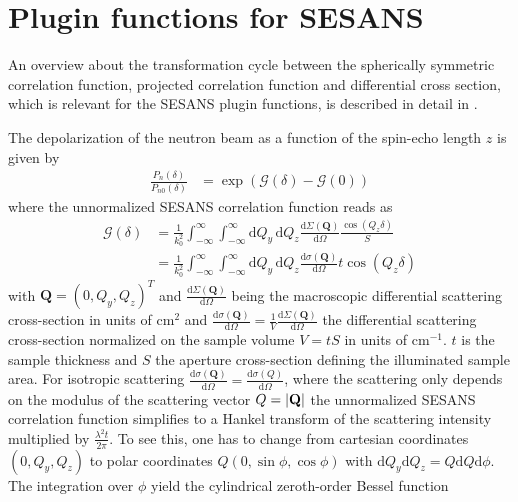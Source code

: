 \clearpage
\section{Plugin functions for SESANS}
\label{ch:pluginsSESANS}

An overview about the transformation cycle between the spherically symmetric correlation function, projected correlation function and differential cross section, which is relevant for the SESANS plugin functions, is described in detail in \cite{Kohlbrecher2017}.

The depolarization of the neutron beam as a function of the spin-echo length $z$ is given by
\begin{align}
\frac{P_n(\delta)}{P_{n0}(\delta)}&=\exp\left(\mathcal{G}(\delta)-\mathcal{G}(0)\right)
\end{align}
where the unnormalized SESANS correlation function reads as
\begin{align}
\mathcal{G}(\delta) &= \frac{1}{k_0^2} \int_{-\infty}^{\infty}\int_{-\infty}^{\infty} \mathrm{d}Q_y\, \mathrm{d}Q_z \frac{\mathrm{d}\Sigma(\mathbf{Q})}{\mathrm{d}\Omega}\frac{\cos(Q_z \delta)}{S} \\
             &= \frac{1}{k_0^2} \int_{-\infty}^{\infty}\int_{-\infty}^{\infty} \mathrm{d}Q_y\, \mathrm{d}Q_z  \frac{\mathrm{d}\sigma(\mathbf{Q})}{\mathrm{d}\Omega}t \cos(Q_z \delta)
\end{align}
with $\mathbf{Q}=(0,Q_y,Q_z)^T$ and $\frac{\mathrm{d}\Sigma(\mathbf{Q})}{\mathrm{d}\Omega}$ being the macroscopic differential scattering cross-section in units of cm$^2$ and $\frac{\mathrm{d}\sigma(\mathbf{Q})}{\mathrm{d}\Omega}=\frac{1}{V}\frac{\mathrm{d}\Sigma(\mathbf{Q})}{\mathrm{d}\Omega}$ the differential scattering cross-section normalized on the sample volume $V=tS$ in units of cm$^{-1}$. $t$ is the sample thickness and $S$ the aperture cross-section defining the illuminated sample area. For isotropic scattering $\frac{\mathrm{d}\sigma(\mathbf{Q})}{\mathrm{d}\Omega}=\frac{\mathrm{d}\sigma(Q)}{\mathrm{d}\Omega}$, where the scattering only depends on the modulus of the scattering vector $Q={\left\vert\mathbf{Q}\right\vert}$ the unnormalized SESANS correlation function simplifies to a Hankel transform of the scattering intensity multiplied by $\frac{\lambda^2 t}{2\pi}$. To see this, one has to change from cartesian coordinates $(0,Q_y,Q_z)$ to polar coordinates $Q (0,\sin\phi,\cos\phi)$ with $\mathrm{d}Q_y \mathrm{d}Q_z = Q\mathrm{d}Q \mathrm{d}\phi$. The integration over $\phi$ yield the cylindrical zeroth-order Bessel function
